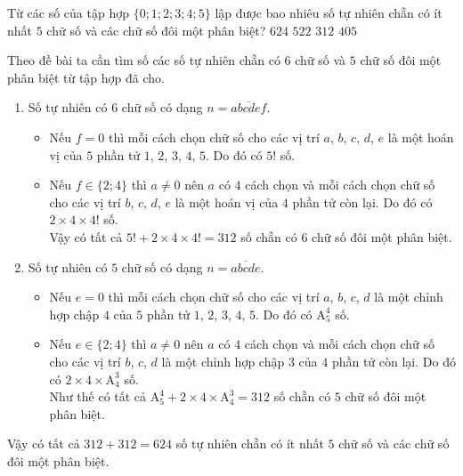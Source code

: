 \begin{ex}%
	Từ các số của tập hợp $\{0;1;2;3;4;5\}$ lập được bao nhiêu số tự nhiên chẵn có ít nhất $5$ chữ số và các chữ số đôi một phân biệt?
	\choice
	{\True $624$}
	{$522$}
	{$312$}
	{$405$}
	\loigiai
	{Theo đề bài ta cần tìm số các số tự nhiên chẵn có $6$ chữ số và $5$ chữ số đôi một phân biệt từ tập hợp đã cho.
		\begin{enumerate}
			\item Số tự nhiên có $6$ chữ số có dạng $n=\overline{abcdef}$.
			\begin{itemize}
				\item Nếu $f=0$ thì mỗi cách chọn chữ số cho các vị trí $a$, $b$, $c$, $d$, $e$ là một hoán vị của $5$ phần tử $1$, $2$, $3$, $4$, $5$. Do đó có $5!$ số.
				\item Nếu $f\in\{2;4\}$ thì $a\neq 0$ nên $a$ có $4$ cách chọn và  mỗi cách chọn chữ số cho các vị trí $b$, $c$, $d$, $e$ là một hoán vị của $4$ phần tử còn lại. Do đó có $2\times 4\times 4!$ số.\\
				Vậy có tất cả $5!+2\times 4\times 4!=312$ số chẵn có $6$ chữ số đôi một phân biệt.
			\end{itemize}
			\item Số tự nhiên có $5$ chữ số có dạng $n=\overline{abcde}$.
			\begin{itemize}
				\item Nếu $e=0$ thì mỗi cách chọn chữ số cho các vị trí $a$, $b$, $c$, $d$ là một chỉnh hợp chập $4$ của $5$ phần tử $1$, $2$, $3$, $4$, $5$. Do đó có $\mathrm{A}_5^4$ số.
				\item Nếu $e\in\{2;4\}$ thì $a\neq 0$ nên $a$ có $4$ cách chọn và  mỗi cách chọn chữ số cho các vị trí $b$, $c$, $d$ là một chỉnh hợp chập $3$ của $4$ phần tử còn lại. Do đó có $2\times 4\times\mathrm{A}_4^3$ số.\\
				Như thế có tất cả $\mathrm{A}_5^4+2\times 4\times\mathrm{A}_4^3=312$ số chẵn có $5$ chữ số đôi một phân biệt.
			\end{itemize}
		\end{enumerate}
		Vậy có tất cả $312+312=624$ số tự nhiên chẵn có ít nhất $5$ chữ số và các chữ số đôi một phân biệt.
	}
\end{ex}
